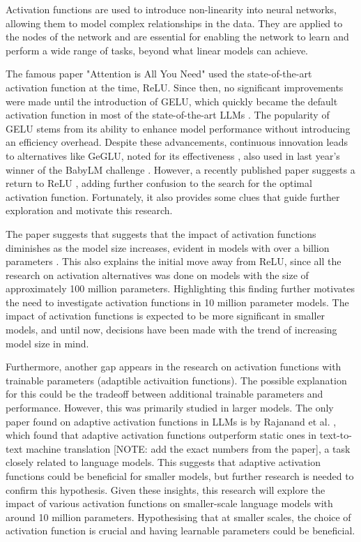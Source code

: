 Activation functions are used to introduce non-linearity into neural networks, allowing them to model complex relationships in the data. They are applied to the nodes of the network and are essential for enabling the network to learn and perform a wide range of tasks, beyond what linear models can achieve.

The famous paper "Attention is All You Need" \cite{Vaswani2017} used the state-of-the-art activation function at the time, ReLU. Since then, no significant improvements were made until the introduction of GELU, which quickly became the default activation function in most of the state-of-the-art LLMs \cite{Lee2023}. The popularity of GELU stems from its ability to enhance model performance without introducing an efficiency overhead. Despite these advancements, continuous innovation leads to alternatives like GeGLU, noted for its effectiveness \cite{Shazeer2020}, also used in last year's winner of the BabyLM challenge \cite{Samuel2023}. However, a recently published paper suggests a return to ReLU \cite{Mirzadeh2023}, adding further confusion to the search for the optimal activation function. Fortunately, it also provides some clues that guide further exploration and motivate this research.

The paper suggests that suggests that the impact of activation functions diminishes as the model size increases, evident in models with over a billion parameters \cite{Mirzadeh2023}. This also explains the initial move away from ReLU, since all the research on activation alternatives was done on models with the size of approximately 100 million parameters. Highlighting this finding further motivates the need to investigate activation functions in 10 million parameter models. The impact of activation functions is expected to be more significant in smaller models, and until now, decisions have been made with the trend of increasing model size in mind.

Furthermore, another gap appears in the research on activation functions with trainable parameters (adaptible activaition functions). The possible explanation for this could be the tradeoff between additional trainable parameters and performance. However, this was primarily studied in larger models. The only paper found on adaptive activation functions in LLMs is by Rajanand et al. \cite{Rajanand}, which found that adaptive activation functions outperform static ones in text-to-text machine translation [NOTE: add the exact numbers from the paper], a task closely related to language models. This suggests that adaptive activation functions could be beneficial for smaller models, but further research is needed to confirm this hypothesis. Given these insights, this research will explore the impact of various activation functions on smaller-scale language models with around 10 million parameters. Hypothesising that at smaller scales, the choice of activation function is crucial and having learnable parameters could be beneficial.

